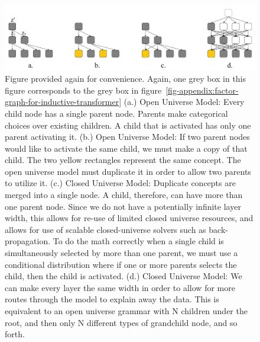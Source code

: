 \documentclass{article}
\begin{document}
\begin{figure}[H]
    \centering
    \includegraphics[width=\textwidth]{figures/from-open-universe-to-closed-universe.pdf}
    \caption{Figure provided again for convenience. Again, one grey box in this figure corresponds to the grey box in figure~\ref{fig-appendix:factor-graph-for-inductive-transformer} (a.) Open Universe Model: Every child node has a single parent node.  Parents make categorical choices over existing children.  A child that is activated has only one parent activating it. (b.) Open Universe Model: If two parent nodes would like to activate the same child, we must make a copy of that child.  The two yellow rectangles represent the same concept.  The open universe model must duplicate it in order to allow two parents to utilize it.  (c.) Closed Universe Model: Duplicate concepts are merged into a single node.  A child, therefore, can have more than one parent node.  Since we do not have a potentially infinite layer width, this allows for re-use of limited closed universe resources, and allows for use of scalable closed-universe solvers such as back-propagation.  To do the math correctly when a single child is simultaneously selected by more than one parent, we must use a conditional distribution where if one or more parents selects the child, then the child is activated. (d.) Closed Universe Model: We can make every layer the same width in order to allow for more routes through the model to explain away the data.  This is equivalent to an open universe grammar with N children under the root, and then only N different types of grandchild node, and so forth.}
    \label{fig:from-open-universe-to-closed-universe-appendix}
\end{figure}
\end{document}
